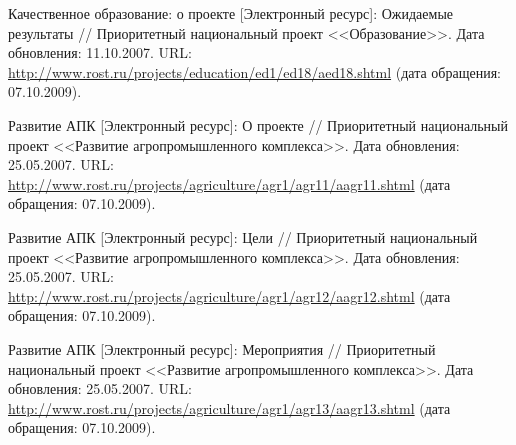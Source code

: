 \begin{thebibliography}{99}
 Качественное образование: о проекте
  [Электронный ресурс]: Ожидаемые результаты // Приоритетный
  национальный проект <<Образование>>. Дата обновления:
  11.10.2007. URL:
  \url{http://www.rost.ru/projects/education/ed1/ed18/aed18.shtml}
  (дата обращения: 07.10.2009).

 Развитие АПК [Электронный ресурс]: О проекте //
  Приоритетный национальный проект <<Развитие агропромышленного
  комплекса>>. Дата обновления: 25.05.2007. URL:
  \url{http://www.rost.ru/projects/agriculture/agr1/agr11/aagr11.shtml}
  (дата обращения: 07.10.2009).

 Развитие АПК [Электронный ресурс]: Цели //
  Приоритетный национальный проект <<Развитие агропромышленного
  комплекса>>. Дата обновления: 25.05.2007. URL:
  \url{http://www.rost.ru/projects/agriculture/agr1/agr12/aagr12.shtml}
  (дата обращения: 07.10.2009).

 Развитие АПК [Электронный ресурс]: Мероприятия //
  Приоритетный национальный проект <<Развитие агропромышленного
  комплекса>>. Дата обновления: 25.05.2007. URL:
  \url{http://www.rost.ru/projects/agriculture/agr1/agr13/aagr13.shtml}
  (дата обращения: 07.10.2009).
  
\end{thebibliography}

